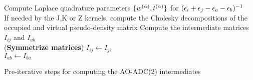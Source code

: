 \begin{algorithm}
Compute Laplace quadrature parameters $\{w^{(\alpha)},t^{(\alpha)}\}$ for $(\epsilon_i + \epsilon_j - \epsilon_a - \epsilon_b)^{-1}$
\\
If needed by the J,K or Z kernels, compute the Cholesky decompositions of the occupied and virtual pseudo-density matrix 
Compute the intermediate matrices $I_{ij}$ and $I_{ab}$
\\
\Substep(\textbf{Symmetrize matrices}){
$I_{ij} \leftarrow I_{ji}$
\\ 
$I_{ab} \leftarrow I_{ba}$
}
\caption{Pre-iterative steps for computing the AO-ADC(2) intermediates}
\label{AODFSOSADC2INTERMEDIATES}
\end{algorithm}
%
